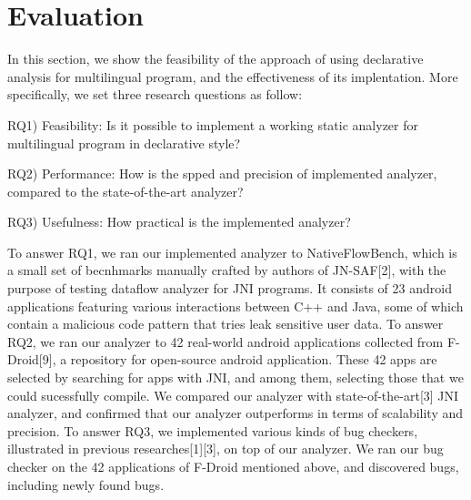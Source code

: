 \section{Evaluation}
In this section, we show the feasibility of the approach of using declarative
analysis for multilingual program, and the effectiveness of its
implentation. More specifically, we set three research questions as follow:

RQ1) Feasibility: Is it possible to implement a working static analyzer for multilingual program in declarative style?

RQ2) Performance: How is the spped and precision of implemented analyzer, compared to the state-of-the-art analyzer?

RQ3) Usefulness: How practical is the implemented analyzer?

To answer RQ1, we ran our implemented analyzer to NativeFlowBench, which is a
small set of becnhmarks manually crafted by authors of JN-SAF[2], with the
purpose of testing dataflow analyzer for JNI programs. It consists of 23
android applications featuring various interactions between C++ and Java, some
of which contain a malicious code pattern that tries leak sensitive user data.
To answer RQ2, we ran our analyzer to 42 real-world android applications
collected from F-Droid[9], a repository for open-source android application. These
42 apps are selected by searching for apps with JNI, and among them, selecting those
that we could sucessfully compile. We compared our analyzer with
state-of-the-art[3] JNI analyzer, and confirmed that our analyzer outperforms
in terms of scalability and precision. To answer RQ3, we implemented various
kinds of bug checkers, illustrated in previous researches[1][3], on top of our
analyzer. We ran our bug checker on the 42 applications of F-Droid mentioned
above, and discovered  bugs, including  newly found bugs.


